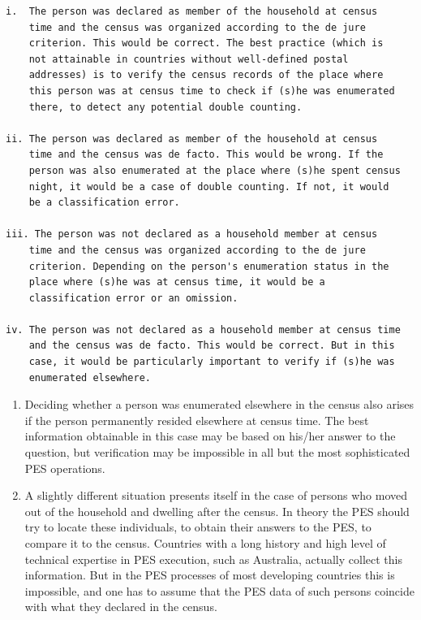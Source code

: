 \documentclass[
]{article}
\begin{document}
\begin{verbatim}
i.  The person was declared as member of the household at census
    time and the census was organized according to the de jure
    criterion. This would be correct. The best practice (which is
    not attainable in countries without well-defined postal
    addresses) is to verify the census records of the place where
    this person was at census time to check if (s)he was enumerated
    there, to detect any potential double counting.

ii. The person was declared as member of the household at census
    time and the census was de facto. This would be wrong. If the
    person was also enumerated at the place where (s)he spent census
    night, it would be a case of double counting. If not, it would
    be a classification error.

iii. The person was not declared as a household member at census
    time and the census was organized according to the de jure
    criterion. Depending on the person's enumeration status in the
    place where (s)he was at census time, it would be a
    classification error or an omission.

iv. The person was not declared as a household member at census time
    and the census was de facto. This would be correct. But in this
    case, it would be particularly important to verify if (s)he was
    enumerated elsewhere.
\end{verbatim}

\begin{enumerate}
\def\labelenumi{\arabic{enumi}.}
\setcounter{enumi}{118}
\item
  Deciding whether a person was enumerated elsewhere in the census
  also arises if the person permanently resided elsewhere at census
  time. The best information obtainable in this case may be based on
  his/her answer to the question, but verification may be impossible
  in all but the most sophisticated PES operations.
\item
  A slightly different situation presents itself in the case of
  persons who moved out of the household and dwelling after the
  census. In theory the PES should try to locate these individuals, to
  obtain their answers to the PES, to compare it to the census.
  Countries with a long history and high level of technical expertise
  in PES execution, such as Australia, actually collect this
  information. But in the PES processes of most developing countries
  this is impossible, and one has to assume that the PES data of such
  persons coincide with what they declared in the census.
\end{enumerate}
\end{document}

